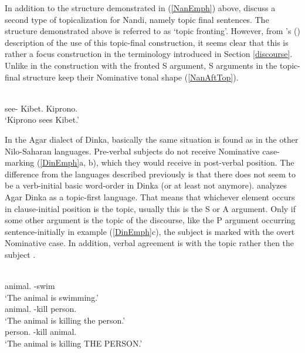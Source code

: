 In addition to the structure demonstrated in (\ref{NanEmph}) above, \citet[124--125]{Creider:1989} discuss a second type of topicalization for Nandi, namely topic final sentences. 
The structure demonstrated above is referred to as `topic fronting'. 
However, from \citeauthor{Creider:1989}'s (\citeyear[150]{Creider:1989}) description of the use of this topic-final construction, it seems clear that this is rather a focus construction in the terminology introduced in Section \ref{discourse}.
Unlike in the construction with the fronted S argument, S arguments in the topic-final structure keep their Nominative tonal shape (\ref{NanAftTop}).


\begin{exe} \ex\label{NanAftTop}
\gll{}  \\
see-\ipfv{} Kibet.\acc{} Kiprono.\nom{}\\
\glt `Kiprono sees  Kibet.'
\end{exe}

In the Agar dialect of Dinka, basically the same situation  is found as in the other Nilo-Saharan languages. 
Pre-verbal subjects do not receive Nominative case-marking (\ref{DinEmph}a, b), which they would receive in post-verbal position. 
The difference from the languages described previously is that there does not seem to be a verb-initial basic word-order in Dinka (or at least not anymore).  
\citet{Andersen:1991} analyzes Agar Dinka as a topic-first language. 
That means that whichever element occurs in clause-initial position is the topic, usually this is the S or A argument. 
Only if some other argument is the topic of the discourse, like the P argument occurring sentence-initially in example (\ref{DinEmph}c), the subject is marked with the overt Nominative case. 
In addition, verbal agreement is with the topic rather then the subject \citep{Andersen:1991}. 

\begin{exe}\ex\label{DinEmph}
\begin{xlist} 
\ex\gll {} \\
animal.\acc{} \decl{}-swim\\
\glt `The animal is swimming.'
\ex\gll {}  \\
animal.\acc{} \decl{}-kill person.\acc{}\\
\glt `The animal is killing the person.'
\ex\gll {}  \\
person.\acc{} \decl{}-kill animal.\nom{}\\
\glt `The animal is killing THE PERSON.' 
\end{xlist}
\end{exe}

